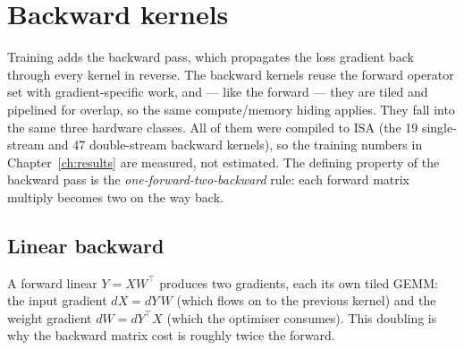 \documentclass[11pt]{report}
\begin{document}
\section{Backward kernels}
\label{sec:impl-backward}

Training adds the backward pass, which propagates the loss gradient back
through every kernel in reverse. The backward kernels reuse the forward
operator set with gradient-specific work, and --- like the forward --- they
are tiled and pipelined for overlap, so the same compute/memory hiding
applies. They fall into the same three hardware classes. All of them were
compiled to ISA (the 19 single-stream and 47 double-stream backward kernels),
so the training numbers in Chapter~\ref{ch:results} are measured, not
estimated. The defining property of the backward pass is the
\emph{one-forward-two-backward} rule: each forward matrix multiply becomes
two on the way back.

\subsection{Linear backward}

A forward linear $Y = X W^\top$ produces two gradients, each its own tiled
GEMM: the input gradient $dX = dY\,W$ (which flows on to the previous
kernel) and the weight gradient $dW = dY^\top X$ (which the optimiser
consumes). This doubling is why the backward matrix cost is roughly twice
the forward.

\begin{algorithm}[H]
\DontPrintSemicolon
{}
\caption{Linear backward: two tiled GEMMs ($dX$, $dW$), streamed to HBM}
\end{algorithm}
\end{document}
